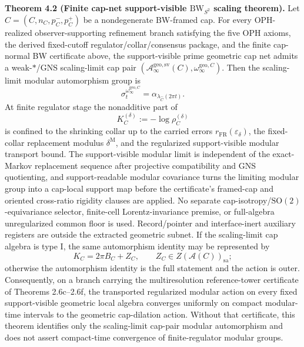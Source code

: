 \textbf{Theorem 4.2 (Finite cap-net support-visible \(\mathrm{BW}_{S^2}\) scaling theorem).} Let
\(\widehat C=(C,n_C,p_C^-,p_C^+)\) be a nondegenerate BW-framed cap. For every OPH-realized
observer-supporting refinement branch satisfying the five OPH axioms, the derived fixed-cutoff
regulator/collar/consensus package, and the finite cap-normal BW certificate above, the
support-visible prime geometric cap net admits a weak-\(*\)/GNS scaling-limit cap pair
\((\mathcal A_\infty^{\mathrm{geo,sv}}(C),\omega_\infty^{\mathrm{geo},C})\). Then the
scaling-limit modular automorphism group is
\[
\sigma_t^{\omega_\infty^{\mathrm{geo},C}}
=
\alpha_{\lambda_{\widehat C}(2\pi t)}.
\]
At finite regulator stage the nonadditive part of
\[
K_C^{(\delta)}:=-\log \rho_C^{(\delta)}
\]
is confined to the shrinking collar up to the carried errors \(r_{\mathrm{FR}}(\varepsilon_\delta)\), the fixed-collar replacement modulus \(\delta^{\mathrm M}\), and the regularized support-visible modular transport bound. The support-visible modular limit is independent of the exact-Markov replacement sequence after projective compatibility and GNS quotienting, and support-readable modular covariance turns the limiting modular group into a cap-local support map before the certificate's framed-cap and oriented cross-ratio rigidity clauses are applied. No separate cap-isotropy/\(\mathrm{SO}(2)\)-equivariance selector, finite-cell Lorentz-invariance premise, or full-algebra unregularized common floor is used. Record/pointer and interface-inert auxiliary registers are outside the extracted geometric subnet. If the scaling-limit cap algebra is type I, the same automorphism identity may be represented by
\[
K_C=2\pi B_C+Z_C,\qquad Z_C\in Z(\mathcal A(C))_{\mathrm{sa}};
\]
otherwise the automorphism identity is the full statement and the action is outer. Consequently,
on a branch carrying the multiresolution reference-tower certificate of Theorems 2.6c--2.6f, the
transported regularized modular action on every fixed support-visible geometric local algebra
converges uniformly on compact modular-time intervals to the geometric cap-dilation action.
Without that certificate, this theorem identifies only the scaling-limit cap-pair modular
automorphism and does not assert compact-time convergence of finite-regulator modular groups.


